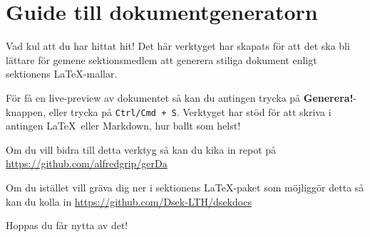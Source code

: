 \documentclass{dsekdoc}
\begin{document}
\setmeeting{}

\section*{Guide till dokumentgeneratorn}
Vad kul att du har hittat hit! 
Det här verktyget har skapats för att det ska bli lättare för gemene sektionsmedlem
att generera stiliga dokument enligt sektionens \LaTeX-mallar.

För få en live-preview av dokumentet så kan du antingen trycka på \textbf{Generera!}-knappen, eller trycka på \texttt{Ctrl/Cmd + S}.
Verktyget har stöd för att skriva i antingen \LaTeX~eller Markdown, hur ballt som helst!

Om du vill bidra till detta verktyg så kan du kika in repot på \url{
    https://github.com/alfredgrip/gerDa
}

Om du istället vill gräva dig ner i sektionens \LaTeX-paket som möjliggör detta så kan du kolla in \url{
    https://github.com/Dsek-LTH/dsekdocs
}

Hoppas du får nytta av det!
\end{document}
